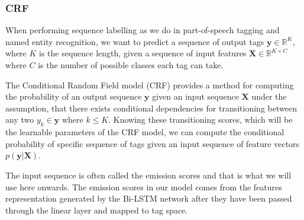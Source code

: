



\subsubsection{CRF}

When performing sequence labelling as we do in part-of-speech tagging and named
entity recognition, we want to predict a sequence of output tags $\bm{y} \in
\mathbb{R}^{K}$, where $K$ is the sequence length, given a sequence of input
features $\bm{X} \in \mathbb{R}^{K \times C}$ where $C$ is the number of
possible classes each tag can take.

The Conditional Random Field model (CRF) provides a method for computing the
probability of an output sequence $\bm{y}$ given an input sequence $\bm{X}$
under the assumption, that there exists conditional dependencies for
transitioning between any two $y_{k} \in \bm{y}$ where $k \leq K$. Knowing these
transitioning scores, which will be the learnable parameters of the CRF model,
we can compute the conditional probability of specific sequence of tags given an
input sequence of feature vectors $p(\bm{y}|\bm{X})$.

The input sequence is often called the emission scores and that is what we will
use here onwards. The emission scores in our model comes from the features
representation generated by the Bi-LSTM network after they have been passed
through the linear layer and mapped to tag space. 










